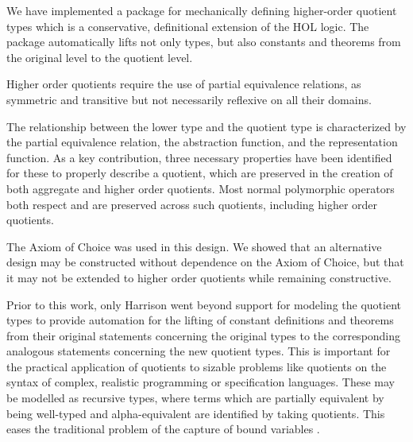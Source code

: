 \documentclass[envcountsame,runningheads]{llncs}
\newcommand{\quotient}{partial equivalence}
\begin{document}
We have implemented a package for mechanically defining higher-order
quotient types
which is a conservative, definitional extension of the HOL logic.
The package automatically lifts not only types,
but also constants and theorems from
the original level to the quotient level.

\begin{comment}
\end{comment}
Higher order quotients require
the use of \quotient{} relations,
as symmetric and transitive but not necessarily reflexive on all
their domains.
\begin{comment}
\end{comment}

The relationship between the lower type and the
quotient type
is characterized by the \quotient{} relation, the abstraction function,
and the representation function. 
As a key contribution,
three necessary properties have been identified
for these to properly describe a quotient,
which are preserved in the creation of both
aggregate and higher order quotients.
Most normal polymorphic operators both respect and are preserved
across such quotients, including higher order quotients.

The Axiom of Choice was used in this design.  We showed that an alternative
design may be constructed without dependence on the Axiom of Choice, but that
it may not be extended to higher order quotients while remaining constructive.

Prior to this work, only Harrison
\cite{Har98} went beyond
support for modeling the quotient types
to provide automation for the lifting of constant definitions
and theorems from their original statements concerning
the original types to the corresponding analogous statements
concerning the new quotient types.  This is important
for the practical application of quotients to sizable problems like
quotients on
the syntax of
complex,
realistic programming or specification
languages.
These may be modelled
as recursive types, where
terms which are
partially equivalent by being
well-typed and alpha-equivalent
are identified by taking quotients.
This eases the traditional problem of the capture of bound variables
\cite{GoMe96}.
\end{document}

